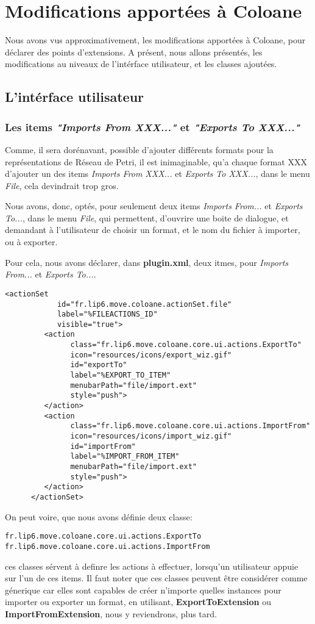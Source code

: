 \documentclass{article}
\begin{document}
\section{Modifications apportées à Coloane}
Nous avons vus approximativement, les modifications apportées à Coloane, pour
déclarer des points d'extensions. A présent, nous allons présentés, les modifications 
au niveaux de l'intérface utilisateur, et les classes ajoutées.

\subsection{L'intérface utilisateur}
\subsubsection{Les items  \textit{"Imports From XXX..."} et \textit{"Exports To XXX..."}}
Comme, il sera dorénavant, possible d'ajouter différents formats pour 
la représentations de Réseau de Petri, il est inimaginable, qu'a chaque format XXX d'ajouter un 
des items \textit{Imports From XXX...} et \textit{Exports To XXX...}, dans le menu \textit{File}, 
cela devindrait trop gros.

Nous avons, donc, optés, pour seulement deux items \textit{Imports From...} et \textit{Exports To...}, 
dans le menu \textit{File}, qui permettent, d'ouvrire une boite de dialogue, et 
demandant à l'utilisateur de choisir un format, et le nom du fichier à importer, ou à exporter.

Pour cela, nous avons déclarer, dans \textbf{plugin.xml}, deux itmes, pour \textit{Imports From...} et 
\textit{Exports To...}.

\begin{verbatim}
<actionSet
            id="fr.lip6.move.coloane.actionSet.file"
            label="%FILEACTIONS_ID"
            visible="true">
         <action
               class="fr.lip6.move.coloane.core.ui.actions.ExportTo"
               icon="resources/icons/export_wiz.gif"
               id="exportTo"
               label="%EXPORT_TO_ITEM"
               menubarPath="file/import.ext"
               style="push">
         </action>
         <action
               class="fr.lip6.move.coloane.core.ui.actions.ImportFrom"
               icon="resources/icons/import_wiz.gif"
               id="importFrom"
               label="%IMPORT_FROM_ITEM"
               menubarPath="file/import.ext"
               style="push">
         </action>
      </actionSet>
\end{verbatim}
On peut voire, que nous avons définie deux classe:
\begin{verbatim}
fr.lip6.move.coloane.core.ui.actions.ExportTo
fr.lip6.move.coloane.core.ui.actions.ImportFrom
\end{verbatim}
ces classes sérvent à definre les actions à effectuer, lorsqu'un utilisateur appuie sur 
l'un de ces items. Il faut noter que ces classes peuvent être considérer comme génerique car 
elles sont capables de créer n'importe quelles instances pour importer ou exporter un format, en utilisant, 
\textbf{ExportToExtension} ou \textbf{ImportFromExtension}, nous y reviendrons, plus tard.
\end{document}
